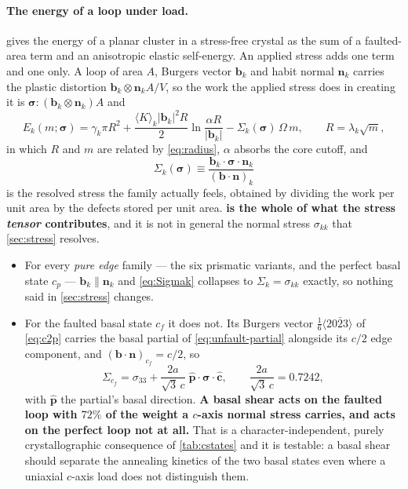 \documentclass{article}
\newcommand{\bvec}{\bm b}
\newcommand{\nvec}{\bm n}
\begin{document}
\paragraph{The energy of a loop under load.}  gives the
energy of a planar cluster in a stress-free crystal as the sum of a faulted-area
term and an anisotropic elastic self-energy. An applied stress adds one term and
one only. A loop of area $A$, Burgers vector $\bvec_k$ and habit normal
$\nvec_k$ carries the plastic distortion $\bvec_k\otimes\nvec_k A/V$, so the
work the applied stress does in creating it is $\bm\sigma\!:\!(\bvec_k\otimes
\nvec_k)A$ and
\begin{equation}
  E_k(m;\bm\sigma)
   =\gamma_k\pi R^2
   +\frac{\langle K\rangle_k|\bvec_k|^2R}{2}\ln\frac{\alpha R}{|\bvec_k|}
   -\Sigma_k(\bm\sigma)\,\Omega\,m,
  \qquad R=\lambda_k\sqrt m,
  \label{eq:Eloopstress}
\end{equation}
in which $R$ and $m$ are related by \cref{eq:radius}, $\alpha$ absorbs the core
cutoff, and
\begin{equation}
  \Sigma_k(\bm\sigma)
   \equiv\frac{\bvec_k\!\cdot\!\bm\sigma\!\cdot\!\nvec_k}
              {(\bvec\!\cdot\!\nvec)_k}
  \label{eq:Sigmak}
\end{equation}
is the resolved stress the family actually feels, obtained by dividing the work
per unit area by the defects stored per unit area. \textbf{ is
the whole of what the stress \emph{tensor} contributes}, and it is not in general
the normal stress $\sigma_{kk}$ that \cref{sec:stress} resolves.

\begin{itemize}
\item For every \emph{pure edge} family --- the six prismatic variants, and the
      perfect basal state $c_p$ --- $\bvec_k\parallel\nvec_k$ and
      \cref{eq:Sigmak} collapses to $\Sigma_k=\sigma_{kk}$ exactly, so nothing
      said in \cref{sec:stress} changes.
\item For the faulted basal state $c_f$ it does not. Its Burgers vector
      $\tfrac16\langle20\bar23\rangle$ of \cref{eq:c2p} carries the basal partial
      of \cref{eq:unfault-partial} alongside its $c/2$ edge component, and
      $(\bvec\!\cdot\!\nvec)_{c_f}=c/2$, so
      \begin{equation}
        \Sigma_{c_f}=\sigma_{33}
          +\frac{2a}{\sqrt3\,c}\;\hat{\bm p}\!\cdot\!\bm\sigma\!\cdot\!\hat{\bm c},
        \qquad
        \frac{2a}{\sqrt3\,c}=0.7242,
        \label{eq:Sigmacf}
      \end{equation}
      with $\hat{\bm p}$ the partial's basal direction. \textbf{A basal shear
      acts on the faulted loop with $72\%$ of the weight a $c$-axis normal stress
      carries, and acts on the perfect loop not at all.} That is a
      character-independent, purely crystallographic consequence of
      \cref{tab:cstates} and it is testable: a basal shear should separate the
      annealing kinetics of the two basal states even where a uniaxial $c$-axis
      load does not distinguish them.
\end{itemize}
\end{document}
